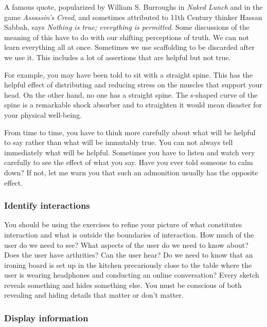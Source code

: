 A famous quote, popularized by William S. Burroughs in \emph{Naked
Lunch} and in the game \emph{Assassin's Creed}, and sometimes attributed
to 11th Century thinker Hassan Sabbah, says \emph{Nothing is true;
everything is permitted}. Some discussions of the meaning of this have
to do with our shifting perceptions of truth. We can not learn
everything all at once. Sometimes we use scaffolding to be discarded
after we use it. This includes a lot of assertions that are helpful but
not true.

For example, you may have been told to sit with a straight spine. This
has the helpful effect of distributing and reducing stress on the
muscles that support your head. On the other hand, no one has a straight
spine. The s-shaped curve of the spine is a remarkable shock absorber
and to straighten it would mean disaster for your physical well-being.

From time to time, you have to think more carefully about what will be
helpful to say rather than what will be immutably true. You can not
always tell immediately what will be helpful. Sometimes you have to
listen and watch very carefully to see the effect of what you say. Have
you ever told someone to calm down? If not, let me warn you that such an
admonition usually has the opposite effect.

\hypertarget{identify-interactions}{%
\subsubsection{Identify interactions}\label{identify-interactions}}

You should be using the exercises to refine your picture of what
constitutes interaction and what is outside the boundaries of
interaction. How much of the user do we need to see? What aspects of the
user do we need to know about? Does the user have arthrities? Can the
user hear? Do we need to know that an ironing board is set up in the
kitchen precariously close to the table where the user is wearing
headphones and conducting an online conversation? Every sketch reveals
something and hides something else. You must be conscious of both
revealing and hiding details that matter or don't matter.

\hypertarget{display-information}{%
\subsubsection{Display information}\label{display-information}}

